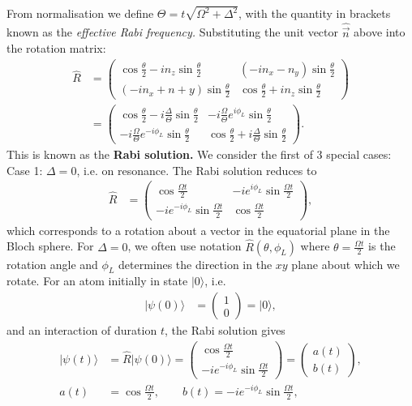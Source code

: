 \documentclass[lasers.tex]{subfiles}
\begin{document}
\chapter{}
From normalisation we define $\Theta=t\sqrt{\Omega^2+\Delta^2}$, with the quantity in brackets known as the \emph{effective Rabi frequency.}
Substituting the unit vector $\hat{\vec{n}}$ above into the rotation matrix:
\begin{align}
    \hat{R} &= \begin{pmatrix} \cos\frac{\theta}{2}-in_z\sin\frac{\theta}{2} & (-in_x-n_y)\sin\frac{\theta}{2} \\ (-in_x+n+y)\sin\frac{\theta}{2} & \cos\frac{\theta}{2}+in_z\sin\frac{\theta}{2}\end{pmatrix} \\
            &= \begin{pmatrix} \cos\frac{\theta}{2}-i\frac{\Delta}{\Theta}\sin\frac{\theta}{2} & -i\frac{\Omega}{\Theta}e^{i\phi_L}\sin\frac{\theta}{2} \\ -i\frac{\Omega}{\Theta}e^{-i\phi_L}\sin\frac{\theta}{2} & \cos\frac{\theta}{2}+i\frac{\Delta}{\Theta}\sin\frac{\theta}{2}\end{pmatrix}.
\end{align}
This is known as the \textbf{Rabi solution.}
We consider the first of 3 special cases:\\
Case 1: $\Delta=0$, i.e. on resonance. The Rabi solution reduces to
\begin{align}
    \hat{R} &= \begin{pmatrix} \cos\frac{\Omega t}{2} & -ie^{i\phi_L}\sin\frac{\Omega t}{2} \\ -ie^{-i\phi_L}\sin\frac{\Omega t}{2} & \cos\frac{\Omega t}{2}\end{pmatrix},
\end{align}
which corresponds to a rotation about a vector in the equatorial plane in the Bloch sphere.
For $\Delta=0$, we often use notation $\hat{R}(\theta,\phi_L)$ where $\theta=\frac{\Omega t}{2}$ is the rotation angle and $\phi_L$ determines the direction in the $xy$ plane about which we rotate. 
For an atom initially in state $|0\rangle$, i.e.
\begin{align}
    |\psi(0)\rangle &= \begin{pmatrix}1\\ 0\end{pmatrix} = |0\rangle,
\end{align}
and an interaction of duration $t$, the Rabi solution gives
\begin{align}
    |\psi(t)\rangle &= \hat{R}|\psi(0)\rangle = \begin{pmatrix} \cos\frac{\Omega t}{2} \\ -ie^{-i\phi_L}\sin\frac{\Omega t}{2} \end{pmatrix} = \begin{pmatrix} a(t) \\ b(t)\end{pmatrix}, \\
    a(t) &= \cos\frac{\Omega t}{2}, \qquad b(t) = -ie^{-i\phi_L}\sin\frac{\Omega t}{2},
\end{align}
\end{document}
